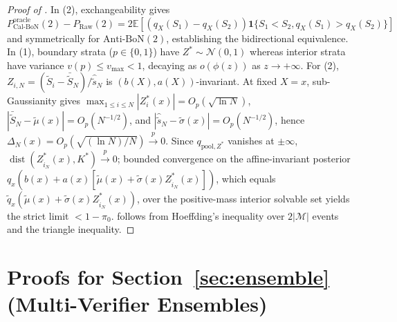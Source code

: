 \documentclass{article}
\theoremstyle{plain}
\theoremstyle{definition}
\theoremstyle{remark}
\newcommand{\E}{\mathbb{E}}
\newcommand{\ind}{\mathbf{1}}
\begin{document}
\begin{proof}[Proof of ]
In (2), exchangeability gives $P_{\mathrm{Cal\text{-}BoN}}^{\mathrm{oracle}}(2) - P_{\mathrm{Raw}}(2) = 2\E[(q_X(S_1)-q_X(S_2))\ind\{S_1<S_2, q_X(S_1)>q_X(S_2)\}]$ and symmetrically for $\mathrm{Anti\text{-}BoN}(2)$, establishing the bidirectional equivalence. In (1), boundary strata ($p \in \{0,1\}$) have $Z^* \sim \mathcal{N}(0,1)$ whereas interior strata have variance $v(p) \le v_{\max} < 1$, decaying as $o(\phi(z))$ as $z \to +\infty$. For (2), $Z_{i,N} = (\tilde{S}_i - \bar{\tilde{S}}_N)/\hat{\tilde{s}}_N$ is $(b(X), a(X))$-invariant. At fixed $X=x$, sub-Gaussianity gives $\max_{1\le i\le N}|Z_i^*(x)| = O_p(\sqrt{\ln N})$, $|\bar{\tilde{S}}_N - \tilde{\mu}(x)| = O_p(N^{-1/2})$, and $|\hat{\tilde{s}}_N - \tilde{\sigma}(x)| = O_p(N^{-1/2})$, hence $\Delta_N(x) = O_p(\sqrt{(\ln N)/N}) \xrightarrow{p} 0$. Since $q_{\mathrm{pool}, Z^*}$ vanishes at $\pm\infty$, $\operatorname{dist}(Z_{\hat{i}_N}^*(x), K^*) \xrightarrow{p} 0$; bounded convergence on the affine-invariant posterior $q_x(b(x)+a(x)[\tilde{\mu}(x)+\tilde{\sigma}(x)Z_{\hat{i}_N}^*(x)])$, which equals $\tilde{q}_x(\tilde{\mu}(x)+\tilde{\sigma}(x)Z_{\hat{i}_N}^*(x))$, over the positive-mass interior solvable set yields the strict limit $< 1-\pi_0$.  follows from Hoeffding's inequality over $2|\mathcal{M}|$ events and the triangle inequality.
\end{proof}

\section{Proofs for Section~\texorpdfstring{\ref{sec:ensemble}}{6} (Multi-Verifier Ensembles)}
\label{app:ensemble}
\end{document}
